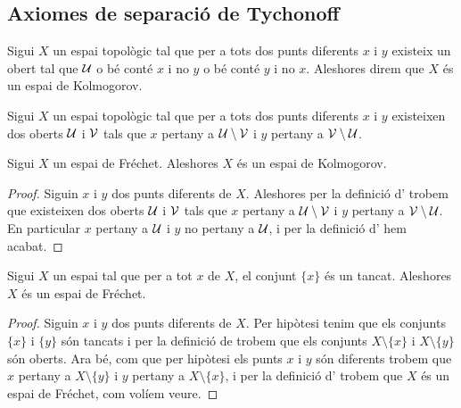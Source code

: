 \documentclass[../Apunts.tex]{subfiles}
\begin{document}
	\subsection{Axiomes de separació de Tychonoff}
	\begin{definition}
		\label{def:espai de Kolmogorov}
		Sigui \(X\) un espai topològic tal que per a tots dos punts diferents \(x\) i \(y\) existeix un obert tal que \(\mathcal{U}\) o bé conté \(x\) i no \(y\) o bé conté \(y\) i no \(x\). Aleshores direm que \(X\) és un espai de Kolmogorov.
	\end{definition}
	\begin{definition}
		\label{def:espai de Fréchet}
		Sigui \(X\) un espai topològic tal que per a tots dos punts diferents \(x\) i \(y\) existeixen dos oberts \(\mathcal{U}\) i \(\mathcal{V}\) tals que \(x\) pertany a \(\mathcal{U}\setminus\mathcal{V}\) i \(y\) pertany a \(\mathcal{V}\setminus\mathcal{U}\).
	\end{definition}
	\begin{proposition}
		\label{prop:els espais de Fréchet són de Kolmogorov}
		Sigui \(X\) un espai de Fréchet. Aleshores \(X\) és un espai de Kolmogorov.
		\begin{proof}
			Siguin \(x\) i \(y\) dos punts diferents de \(X\). Aleshores per la definició d' trobem que existeixen dos oberts \(\mathcal{U}\) i \(\mathcal{V}\) tals que \(x\) pertany a \(\mathcal{U}\setminus\mathcal{V}\) i \(y\) pertany a \(\mathcal{V}\setminus\mathcal{U}\). En particular \(x\) pertany a \(\mathcal{U}\) i \(y\) no pertany a \(\mathcal{U}\), i per la definició d' hem acabat.
		\end{proof}
	\end{proposition}
	\begin{proposition}
		\label{prop:si en un espai topològic tots els punts són tancats aquest és Fréchet}
		Sigui \(X\) un espai tal que per a tot \(x\) de \(X\), el conjunt \(\{x\}\) és un tancat. Aleshores \(X\) és un espai de Fréchet.
		\begin{proof}
			Siguin \(x\) i \(y\) dos punts diferents de \(X\). Per hipòtesi tenim que els conjunts \(\{x\}\) i \(\{y\}\) són tancats i per la definició de  trobem que els conjunts \(X\setminus\{x\}\) i \(X\setminus\{y\}\) són oberts. Ara bé, com que per hipòtesi els punts \(x\) i \(y\) són diferents trobem que \(x\) pertany a \(X\setminus\{y\}\) i \(y\) pertany a \(X\setminus\{x\}\), i per la definició d' trobem que \(X\) és un espai de Fréchet, com volíem veure.
		\end{proof}
	\end{proposition}
\end{document}
